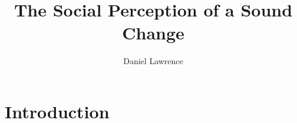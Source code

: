 \documentclass[PWPL]{article}
\title{The Social Perception of a Sound Change}
\author{Daniel Lawrence}
\begin{document}
\maketitle

\section{Introduction}
\end{document}
